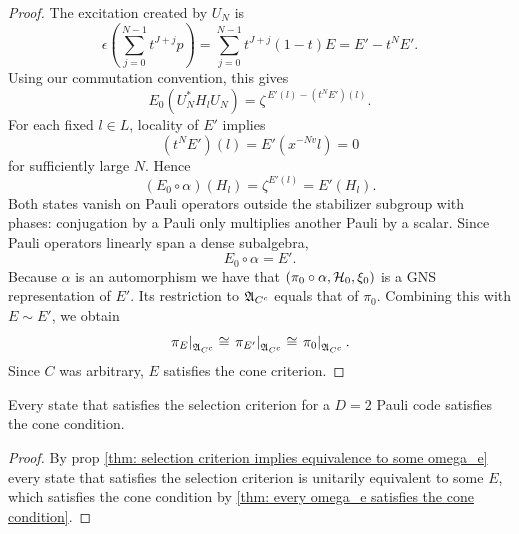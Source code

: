 \documentclass[11pt]{amsart}
\begin{document}
\begin{thm}
\begin{proof}
The excitation created by $U_N$ is
\[
\epsilon\!\left(\sum_{j=0}^{N-1}t^{J+j}p\right)
=\sum_{j=0}^{N-1}t^{J+j}(1-t)E
=E'-t^NE'.
\]
Using our commutation convention, this gives
\[
E_0\!\left(U_N^*H_lU_N\right)
=\zeta^{\,E'(l)-(t^NE')(l)}.
\]
For each fixed $l\in L$, locality of $E'$ implies
\[
(t^NE')(l)=E'(x^{-Nv}l)=0
\]
for sufficiently large $N$. Hence
\[
(E_0\circ\alpha)(H_l)=\zeta^{E'(l)}=E'(H_l).
\]
Both states vanish on Pauli operators outside the stabilizer subgroup with phases: conjugation by a Pauli only multiplies another Pauli by a scalar. Since Pauli operators linearly span a dense subalgebra,
\[
E_0\circ\alpha=E'.
\]
Because $\alpha$ is an automorphism we have that $(\pi_0\circ\alpha,\mathcal{H}_0,\xi_0)$ is a GNS representation of $E'$. Its restriction to $\mathfrak{A}_{C^c}$ equals that of $\pi_0$. Combining this with $E\sim E'$, we obtain
\[
\left.\pi_E\right|_{\mathfrak{A}_{C^c}}
\cong
\left.\pi_{E'}\right|_{\mathfrak{A}_{C^c}}
\cong
\left.\pi_0\right|_{\mathfrak{A}_{C^c}}.
\]
Since $C$ was arbitrary, $E$ satisfies the cone criterion.
\end{proof}
\end{thm}
\begin{cor}
    Every state that satisfies the selection criterion for a $D=2$ Pauli code satisfies the cone condition.
    \begin{proof}
        By prop \ref{thm: selection criterion implies equivalence to some omega_e} every state that satisfies the selection criterion is unitarily equivalent to some $E$, which satisfies the cone condition by \ref{thm: every omega_e satisfies the cone condition}.
    \end{proof}
\end{cor}
\end{document}
